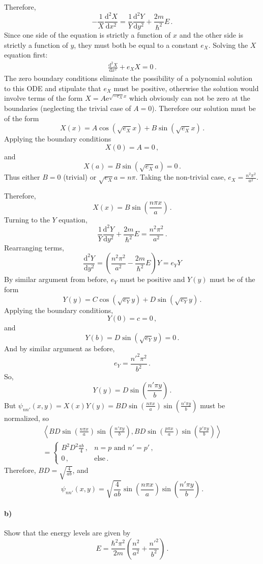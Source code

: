 \documentclass[letterpaper,10pt]{article}
\def\expect#1{\left\langle #1\right\rangle}
\def\d{\mathrm{d}}
\def\e{\mathrm{e}}
\begin{document}
Therefore,
\[
-\frac{1}{X}\frac{\d^2X}{\d x^2}=\frac{1}{Y}\frac{\d^2Y}{\d y^2}
+\frac{2m}{\hbar^2}E\,.
\]
Since one side of the equation is strictly a function of $x$ and the other side
is strictly a function of $y$, they must both be equal to a constant $e_X$.
Solving the $X$ equation first:
\begin{align*}
\frac{\d^2X}{\d x^2}+e_XX=0\,.
\end{align*}
The zero boundary conditions eliminate the possibility of a polynomial solution
to this ODE and stipulate that $e_X$ must be positive, otherwise the solution
would involve terms of the form $X=A\e^{\sqrt{-e_X}x}$ which obviously can not
be
zero at the boundaries (neglecting the trivial case of $A=0$). Therefore our
solution must be of the form
\[
X(x)=A\cos(\sqrt{e_X}x)+B\sin(\sqrt{e_X}x)\,.
\]
Applying the boundary conditions
\[
X(0)=A=0\,,
\]
and
\[
X(a)=B\sin(\sqrt{e_X}a)=0\,.
\]
Thus either $B=0$ (trivial) or $\sqrt{e_X}a=n\pi$. Taking the non-trivial case,
$e_X=\frac{n^2\pi^2}{a^2}$.

Therefore,
\[
X(x)=B\sin\left(\frac{n\pi x}{a}\right)\,.
\]
Turning to the $Y$ equation,
\[
\frac{1}{Y}\frac{\d^2Y}{\d y^2}+\frac{2m}{\hbar^2}E=\frac{n^2\pi^2}{a^2}\,.
\]
Rearranging terms,
\[
\frac{\d^2Y}{\d y^2}=\left(\frac{n^2\pi^2}{a^2}-\frac{2m}{\hbar^2}E\right)Y
=e_YY
\]
By similar argument from before, $e_Y$ must be positive and $Y(y)$ must be of
the form
\[
Y(y)=C\cos(\sqrt{e_Y}y)+D\sin(\sqrt{e_Y}y)\,.
\]
Applying the boundary conditions,
\[
Y(0)=c=0\,,
\]
and
\[
Y(b)=D\sin(\sqrt{e_Y}y)=0\,.
\]
And by similar argument as before,
\[
e_Y=\frac{n'^2\pi^2}{b^2}\,.
\]
So,
\[
Y(y)=D\sin\left(\frac{n'\pi y}{b}\right)\,.
\]
But $\psi_{nn'}(x,y)=X(x)Y(y)=BD\sin\left(\frac{n\pi x}{a}\right)
\sin\left(\frac{n'\pi y}{b}\right)$ must be normalized, so
\begin{multline*}
\expect{BD\sin\left(\frac{n\pi x}{a}\right)
\sin\left(\frac{n'\pi y}{b}\right),BD\sin\left(\frac{p\pi x}{a}\right)
\sin\left(\frac{p'\pi y}{b}\right)}\\=
\begin{cases}
B^2D^2\frac{ab}{4}\,, & n=p\text{ and }n'=p'\,,\\
0\,, & \text{else}\,.
\end{cases}
\end{multline*}
Therefore, $BD=\sqrt{\frac{4}{ab}}$, and
\[
\psi_{nn'}(x,y)=\sqrt{\frac{4}{ab}}\sin\left(\frac{n\pi x}{a}\right)
\sin\left(\frac{n'\pi y}{b}\right)\,.
\]
\paragraph*{b)} Show that the energy levels are given by
\[
E=\frac{\hbar^2\pi^2}{2m}\left(\frac{n^2}{a^2}+\frac{{n'}^2}{b^2}\right)\,.
\]
\end{document}

